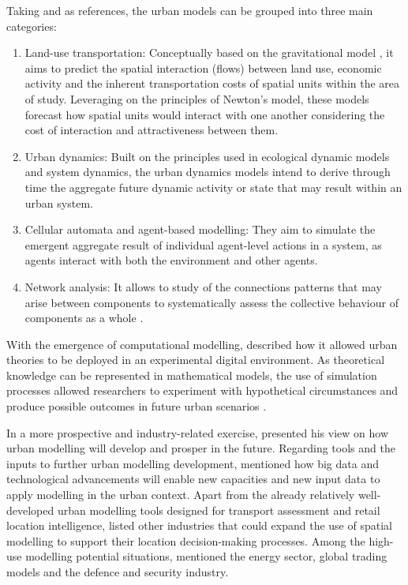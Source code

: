 \documentclass[12pt, a4paper]{report}
\begin{document}
Taking \cite{battyUrbanModeling2009a} and \cite{wilsonFutureUrbanModelling2018} as references, the urban models can be grouped into three main categories: 

\begin{enumerate}
  \item Land-use transportation: Conceptually based on the gravitational model \citep{battyUrbanModellingAlgorithms1976}, it aims to predict the spatial interaction (flows) between land use, economic activity and the inherent transportation costs of spatial units within the area of study. Leveraging on the principles of Newton's model, these models forecast how spatial units would  interact with one another considering the cost of interaction and attractiveness between them.
  \item Urban dynamics: Built on the principles used in ecological dynamic models and system dynamics, the urban dynamics models intend to derive through time the aggregate future dynamic activity or state that may result within an urban system.
  \item Cellular automata and agent-based modelling: They aim to simulate the emergent aggregate result of individual agent-level actions in a system, as agents interact with both the environment and other agents.
  \item Network analysis: It allows to study of the connections patterns that may arise between components to systematically assess the collective behaviour of components as a whole \citep{newmanNetworksIntroduction2010}.
\end{enumerate}

With the emergence of computational modelling, \cite{battyUrbanModeling2009a} described how it allowed urban theories to be deployed in an experimental digital environment. As theoretical knowledge can be represented in mathematical models, the use of simulation processes allowed researchers to experiment with hypothetical circumstances and produce possible outcomes in future urban scenarios \citep{battyUrbanModeling2009a}.


In a more prospective and industry-related exercise, \cite{wilsonFutureUrbanModelling2018} presented his view on how urban modelling will develop and prosper in the future. Regarding tools and the inputs to further urban modelling development, \cite{wilsonFutureUrbanModelling2018} mentioned how big data and technological advancements will enable new capacities and new input data to apply modelling in the urban context. Apart from the already relatively well-developed urban modelling tools designed for transport assessment and retail location intelligence, \cite{wilsonFutureUrbanModelling2018} listed other industries that could expand the use of spatial modelling to support their location decision-making processes. Among the high-use modelling potential situations, \cite{wilsonFutureUrbanModelling2018} mentioned the energy sector, global trading models and the defence and security industry.
\end{document}
